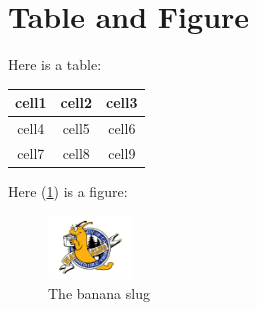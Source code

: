 \documentclass[%
	draft, %
	12pt, %
]{scrbook} %
\begin{document}
\section{Table and Figure}
Here is a table:
\begin{center}
	\begin{tabular}{ c | c c }
		cell1 & cell2 & cell3 \\ 
		\hline
		cell4 & cell5 & cell6 \\  
		cell7 & cell8 & cell9    
	 \end{tabular}
\end{center}
Here (\cref{fig:logo}) is a figure:
\begin{figure}[h!]
	\centering
  \includegraphics[width=0.2\textwidth]{images/UCSC-logo.png}
  \caption{The banana slug}
  \label{fig:logo}
\end{figure}
\clearpage
\end{document}
